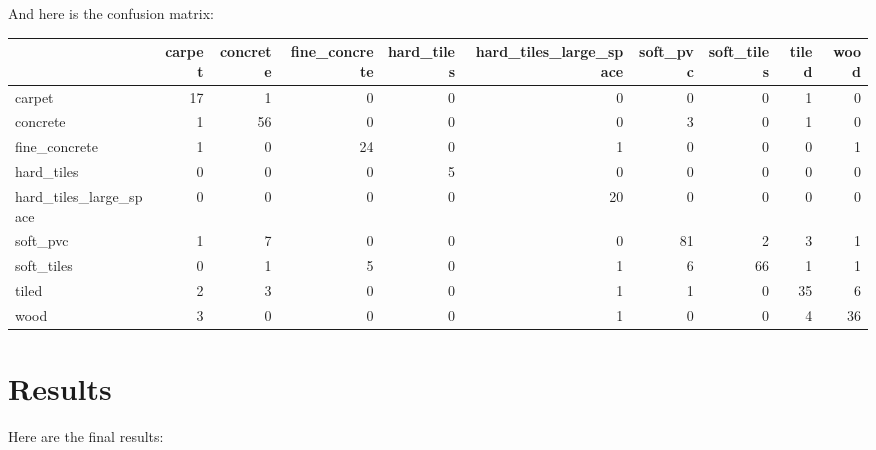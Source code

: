 \documentclass[]{article}
\newenvironment{Shaded}{\begin{snugshade}}{\end{snugshade}}
\newcommand{\CommentTok}[1]{\textcolor[rgb]{0.56,0.35,0.01}{\textit{#1}}}
\newcommand{\DataTypeTok}[1]{\textcolor[rgb]{0.13,0.29,0.53}{#1}}
\newcommand{\KeywordTok}[1]{\textcolor[rgb]{0.13,0.29,0.53}{\textbf{#1}}}
\newcommand{\NormalTok}[1]{#1}
\newcommand{\OperatorTok}[1]{\textcolor[rgb]{0.81,0.36,0.00}{\textbf{#1}}}
\newcommand{\StringTok}[1]{\textcolor[rgb]{0.31,0.60,0.02}{#1}}
\begin{document}
And here is the confusion matrix:

\begin{Shaded}
\end{Shaded}

\begin{longtable}[]{@{}lrrrrrrrrr@{}}
\toprule
& carpet & concrete & fine\_concrete & hard\_tiles &
hard\_tiles\_large\_space & soft\_pvc & soft\_tiles & tiled &
wood\tabularnewline
\midrule
\endhead
carpet & 17 & 1 & 0 & 0 & 0 & 0 & 0 & 1 & 0\tabularnewline
concrete & 1 & 56 & 0 & 0 & 0 & 3 & 0 & 1 & 0\tabularnewline
fine\_concrete & 1 & 0 & 24 & 0 & 1 & 0 & 0 & 0 & 1\tabularnewline
hard\_tiles & 0 & 0 & 0 & 5 & 0 & 0 & 0 & 0 & 0\tabularnewline
hard\_tiles\_large\_space & 0 & 0 & 0 & 0 & 20 & 0 & 0 & 0 &
0\tabularnewline
soft\_pvc & 1 & 7 & 0 & 0 & 0 & 81 & 2 & 3 & 1\tabularnewline
soft\_tiles & 0 & 1 & 5 & 0 & 1 & 6 & 66 & 1 & 1\tabularnewline
tiled & 2 & 3 & 0 & 0 & 1 & 1 & 0 & 35 & 6\tabularnewline
wood & 3 & 0 & 0 & 0 & 1 & 0 & 0 & 4 & 36\tabularnewline
\bottomrule
\end{longtable}

\hypertarget{results}{%
\section{Results}\label{results}}

Here are the final results:

\begin{Shaded}
\end{Shaded}
\end{document}
